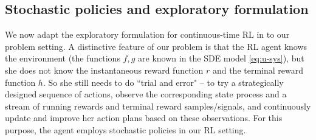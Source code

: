 \documentclass[11pt]{article}
\begin{document}

\subsection{Stochastic policies and exploratory formulation}\label{sec:explora}

We now adapt the exploratory formulation for continuous-time RL in \cite{Wang20,jia2023q} to our problem setting. %
A distinctive feature of our problem is that  the RL agent knows the environment (the functions $f, g$ are known in the SDE model \eqref{eq:u-sys}), but she does not know the instantaneous reward function $r$  and the terminal reward function $h$. So she still needs to do ``trial and error" -- to try a strategically designed sequence of actions, observe the corresponding state process and a stream of running rewards and terminal reward samples/signals, and continuously update and improve her action plans based on these observations. For this purpose, the agent employs stochastic policies in our RL setting.
\end{document}
